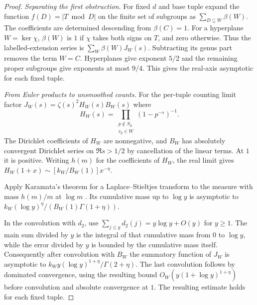 \begin{proof}
\emph{Separating the first obstruction.}
For fixed $d$ and base tuple expand the function $f(D)=|T\bmod D|$ on the finite set of subgroups as $\sum_{D\subseteq W}\beta(W)$. The coefficients are determined descending from $\beta(C)=1$. For a hyperplane $W=\ker\chi$, $\beta(W)$ is $1$ if $\chi$ takes both signs on $T$, and zero otherwise. Thus the labelled-extension series is $\sum_W\beta(W)J_W(s)$. Subtracting its genus part removes the term $W=C$. Hyperplanes give exponent $5/2$ and the remaining proper subgroups give exponents at most $9/4$. This gives the real-axis asymptotic for each fixed tuple.

\emph{From Euler products to unsmoothed counts.}
For the per-tuple counting limit factor $J_W(s)=\zeta(s)^2 H_W(s)B_W(s)$ where
\[
 H_W(s)=\prod_{\substack{p\notin S_d\\v_p\in W}}(1-p^{-s})^{-1}.
\]
The Dirichlet coefficients of $H_W$ are nonnegative, and $B_W$ has absolutely convergent Dirichlet series on $\Re s>1/2$ by cancellation of the linear terms. At $1$ it is positive. Writing $h(m)$ for the coefficients of $H_W$, the real limit gives $H_W(1+x)\sim [k_W/B_W(1)]x^{-\eta}$. 

Apply Karamata's theorem for a Laplace--Stieltjes transform to the measure with mass $h(m)/m$ at $\log m$ \cite[Thm.~1.7.1]{BGT}. Its cumulative mass up to $\log y$ is asymptotic to $k_W(\log y)^\eta/(B_W(1)\Gamma(1+\eta))$. 

In the convolution with $d_2$, use $\sum_{j\le y}d_2(j)=y\log y+O(y)$ for $y\ge1$. The main sum divided by $y$ is the integral of that cumulative mass from $0$ to $\log y$, while the error divided by $y$ is bounded by the cumulative mass itself. Consequently after convolution with $B_W$ the summatory function of $J_W$ is asymptotic to $k_W y(\log y)^{1+\eta}/\Gamma(2+\eta)$. 
The last convolution follows by dominated convergence, using the resulting bound $O_W(y(1+\log y)^{1+\eta})$ before convolution and absolute convergence at $1$. The resulting estimate holds for each fixed tuple.


\end{proof}
